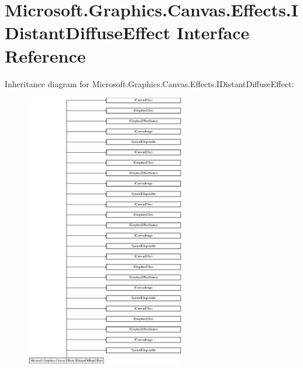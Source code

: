 \hypertarget{interface_microsoft_1_1_graphics_1_1_canvas_1_1_effects_1_1_i_distant_diffuse_effect}{}\section{Microsoft.\+Graphics.\+Canvas.\+Effects.\+I\+Distant\+Diffuse\+Effect Interface Reference}
\label{interface_microsoft_1_1_graphics_1_1_canvas_1_1_effects_1_1_i_distant_diffuse_effect}
Inheritance diagram for Microsoft.\+Graphics.\+Canvas.\+Effects.\+I\+Distant\+Diffuse\+Effect\+:\begin{figure}[H]
\begin{center}
\leavevmode
\includegraphics[height=12.000000cm]{interface_microsoft_1_1_graphics_1_1_canvas_1_1_effects_1_1_i_distant_diffuse_effect}
\end{center}
\end{figure}
